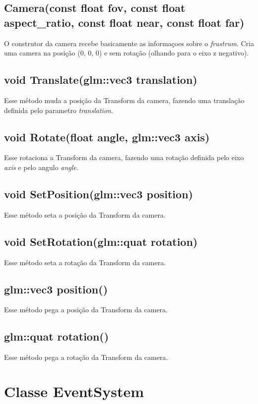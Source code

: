 \subsection{Camera(const float fov, const float aspect\_ratio, const float near, const float far)}
O construtor da camera recebe basicamente as informaçoes sobre o \textit{frustrum}. Cria uma camera na posição (0, 0, 0) e sem rotação (olhando para o eixo z negativo).

\subsection{void Translate(glm::vec3 translation)}
Esse método muda a posição da Transform da camera, fazendo uma translação definida pelo parametro \textit{translation}.
  
\subsection{void Rotate(float angle, glm::vec3 axis)}
Esse rotaciona a Transform da camera, fazendo uma rotação definida pelo eixo \textit{axis} e pelo angulo \textit{angle}.

\subsection{void SetPosition(glm::vec3 position)}
Esse método seta a posição da Transform da camera.

\subsection{void SetRotation(glm::quat rotation)}
Esse método seta a rotação da Transform da camera.

\subsection{glm::vec3 position()}
Esse método pega a posição da Transform da camera.

\subsection{glm::quat rotation()}
Esse método pega a rotação da Transform da camera.

\section{Classe EventSystem}
\label{doc:events}

